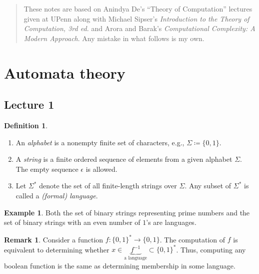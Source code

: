 \documentclass[10pt,letterpaper,cm]{nupset}
\theoremstyle{definition}
\newtheorem*{definition}{Definition}
\newtheorem{exmp}{Example}
\newtheorem{remark}{Remark}
\newcommand{\1}{\mathbf{1}}
\newcommand{\0}{\vec 0}
\begin{document}
\begin{abstract}
These notes are based on Anindya De's ``Theory of Computation'' lectures given at UPenn along with Michael Sipser's \textit{Introduction to the Theory of Computation, 3rd ed.} and Arora and Barak's \textit{Computational Complexity: A Modern Approach}. Any mistake in what follows is my own.
\end{abstract}

\tableofcontents
\newpage

\section{Automata theory}

\subsection{Lecture 1}

\begin{definition} $ $
\begin{enumerate}
\item An \textit{alphabet} is a nonempty finite set of characters, e.g., $\Sigma \coloneqq \{0,1\}$. 
\item A \textit{string} is a finite ordered sequence of elements from a given alphabet $\Sigma$. The empty sequence $\epsilon$ is allowed.
\item Let $\Sigma^{\ast}$ denote the set of all finite-length strings over $\Sigma$. Any subset of $\Sigma^{\ast}$ is called a \textit{(formal) language}.
\end{enumerate}
\end{definition}

\begin{exmp}
Both the set of binary strings representing prime numbers and the set of binary strings with an even number of $1$'s are languages. 
\end{exmp}

\begin{remark}
Consider a function $f: \{0,1\}^{\ast} \to \{0,1\}$. The computation of $f$ is equivalent to determining whether $x\in \underbrace{f^{-1}}_{\text{a language}} \subset \{0,1\}^{\ast}$. Thus, computing any boolean function is the same as determining membership in some language.
\end{remark}
\end{document}
